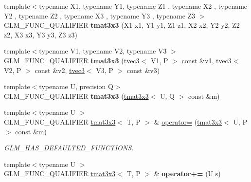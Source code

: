 \begin{DoxyCompactItemize}
\mbox{\label{structglm_1_1tmat3x3_ad8e35f18c7065afeec8ddca4f7497a26}} 
{\footnotesize template$<$typename X1, typename Y1, typename Z1 , typename X2 , typename Y2 , typename Z2 , typename X3 , typename Y3 , typename Z3 $>$ }\\G\+L\+M\+\_\+\+F\+U\+N\+C\+\_\+\+Q\+U\+A\+L\+I\+F\+I\+ER {\bfseries tmat3x3} (X1 x1, Y1 y1, Z1 z1, X2 x2, Y2 y2, Z2 z2, X3 x3, Y3 y3, Z3 z3)
\item 
\mbox{\label{structglm_1_1tmat3x3_a065a41b6dbbc35bc4785e7f429359a2f}} 
{\footnotesize template$<$typename V1, typename V2, typename V3 $>$ }\\G\+L\+M\+\_\+\+F\+U\+N\+C\+\_\+\+Q\+U\+A\+L\+I\+F\+I\+ER {\bfseries tmat3x3} (\hyperlink{structglm_1_1tvec3}{tvec3}$<$ V1, P $>$ const \&v1, \hyperlink{structglm_1_1tvec3}{tvec3}$<$ V2, P $>$ const \&v2, \hyperlink{structglm_1_1tvec3}{tvec3}$<$ V3, P $>$ const \&v3)
\item 
\mbox{\label{structglm_1_1tmat3x3_afdeefb27eb8d3d2a1b10d08487e6a1c9}} 
{\footnotesize template$<$typename U, precision Q$>$ }\\G\+L\+M\+\_\+\+F\+U\+N\+C\+\_\+\+Q\+U\+A\+L\+I\+F\+I\+ER {\bfseries tmat3x3} (\hyperlink{structglm_1_1tmat3x3}{tmat3x3}$<$ U, Q $>$ const \&m)
\item 
\mbox{\label{structglm_1_1tmat3x3_a3d87b69cdea2bbbcca29b6ba356ae943}} 
{\footnotesize template$<$typename U $>$ }\\G\+L\+M\+\_\+\+F\+U\+N\+C\+\_\+\+Q\+U\+A\+L\+I\+F\+I\+ER \hyperlink{structglm_1_1tmat3x3}{tmat3x3}$<$ T, P $>$ \& \hyperlink{structglm_1_1tmat3x3_a3d87b69cdea2bbbcca29b6ba356ae943}{operator=} (\hyperlink{structglm_1_1tmat3x3}{tmat3x3}$<$ U, P $>$ const \&m)
\begin{DoxyCompactList}\small\item\em G\+L\+M\+\_\+\+H\+A\+S\+\_\+\+D\+E\+F\+A\+U\+L\+T\+E\+D\+\_\+\+F\+U\+N\+C\+T\+I\+O\+NS. \end{DoxyCompactList}\item 
\mbox{\label{structglm_1_1tmat3x3_a217d0152118e3bb5f26da12641b5f48a}} 
{\footnotesize template$<$typename U $>$ }\\G\+L\+M\+\_\+\+F\+U\+N\+C\+\_\+\+Q\+U\+A\+L\+I\+F\+I\+ER \hyperlink{structglm_1_1tmat3x3}{tmat3x3}$<$ T, P $>$ \& {\bfseries operator+=} (U s)

\end{DoxyCompactItemize}

